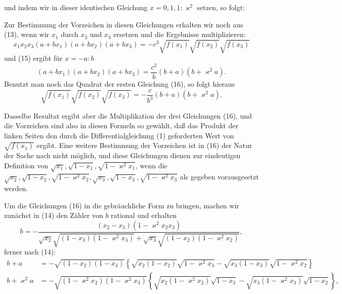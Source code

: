 und indem wir in dieser identischen Gleichung $x = 0, 1, 1:\varkappa^2$
setzen, so folgt:

Zur Bestimmung der Vorzeichen in diesen Gleichungen erhalten
 wir noch aus (13), wenn wir $x_1$ durch $x_2$ und $x_3$ ersetzen
und die Ergebnisse multiplizieren:
\[ x_1x_2x_3(a+bx_1)(a+bx_2)(a+bx_3) = -c^3\sqrt{f(x_1)}\sqrt{f(x_2)}\sqrt{f(x_3)} \]
und (15) ergibt für $x = -a:b$
\[ (a+bx_1)(a+bx_2)(a+bx_3) = \dfrac{c^2}{b}(b+a)(b+\varkappa^2a). \]
Benutzt man noch das Quadrat der ersten Gleichung (16),
so folgt hieraus
\[ \sqrt{f(x_1)}\sqrt{f(x_2)}\sqrt{f(x_3)} = -\dfrac{c}{b^3}(b+a)(b+\varkappa^2a). \]

Dasselbe Resultat ergibt aber die Multiplikation der drei
Gleichungen (16), und die Vorzeichen sind also in diesen Formeln
so gewählt, daß das Produkt der linken Seiten den durch die
Differentialgleichung (1) geforderten Wert von $\sqrt{f(x_1)}$ ergibt.
Eine weitere Bestimmung der Vorzeichen ist in (16) der Natur
der Sache nach nicht möglich, und diese Gleichungen dienen zur
eindeutigen Definition von $\sqrt{x_1}, \sqrt{1-x_1}, \sqrt{1-\varkappa^2x_1}$, wenn die
$\sqrt{x_2}, \sqrt{1-x_2}, \sqrt{1-\varkappa^2x_2}, \sqrt{x_3}, \sqrt{1-x_3}, \sqrt{1-\varkappa^2x_3}$ als gegeben
vorausgesetzt werden.

Um die Gleichungen (16) in die gebräuchliche Form zu
bringen, machen wir zunächst in (14) den Zähler von $b$ rational
und erhalten
\[ b = -\dfrac{(x_2-x_3)(1-\varkappa^2x_2x_3)}{\sqrt{x_2}\sqrt{(1-x_3)(1-\varkappa^2x_3)} + \sqrt{x_3}\sqrt{(1-x_2)(1-\varkappa^2x_2)}}, \]
ferner nach (14):
\[ \begin{aligned}
b+a &= -\sqrt{(1-x_2)(1-x_3)}\left\{\sqrt{x_2(1-x_2)}\sqrt{1-\varkappa^2x_3} - \sqrt{x_3(1-x_3)}\sqrt{1-\varkappa^2x_2}\right\} \\
b+\varkappa^2a &= -\sqrt{(1-\varkappa^2x_2)(1-\varkappa^2x_3)}\left\{\sqrt{x_2(1-\varkappa^2x_2)}\sqrt{1-x_3} - \sqrt{x_3(1-\varkappa^2x_3)}\sqrt{1-x_2}\right\},
\end{aligned} \]
